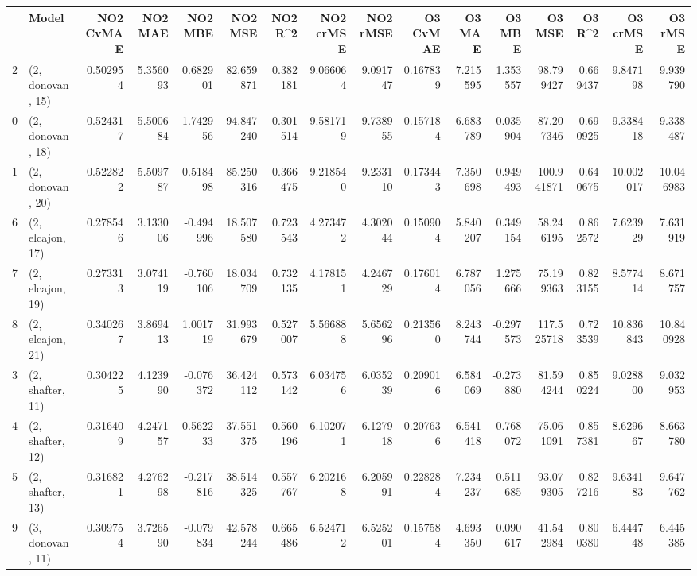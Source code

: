 \begin{tabular}{llrrrrrrrrrrrrrr}
\toprule
{} &             Model &  NO2 CvMAE &   NO2 MAE &   NO2 MBE &    NO2 MSE &   NO2 R\textasciicircum2 &  NO2 crMSE &  NO2 rMSE &  O3 CvMAE &    O3 MAE &    O3 MBE &      O3 MSE &    O3 R\textasciicircum2 &   O3 crMSE &    O3 rMSE \\
\midrule
2  &  (2, donovan, 15) &   0.502954 &  5.356093 &  0.682901 &  82.659871 &  0.382181 &   9.066064 &  9.091747 &  0.167839 &  7.215595 &  1.353557 &   98.799427 &  0.669437 &   9.847198 &   9.939790 \\
0  &  (2, donovan, 18) &   0.524317 &  5.500684 &  1.742956 &  94.847240 &  0.301514 &   9.581719 &  9.738955 &  0.157184 &  6.683789 & -0.035904 &   87.207346 &  0.690925 &   9.338418 &   9.338487 \\
1  &  (2, donovan, 20) &   0.522822 &  5.509787 &  0.518498 &  85.250316 &  0.366475 &   9.218540 &  9.233110 &  0.173443 &  7.350698 &  0.949493 &  100.941871 &  0.640675 &  10.002017 &  10.046983 \\
6  &  (2, elcajon, 17) &   0.278546 &  3.133006 & -0.494996 &  18.507580 &  0.723543 &   4.273472 &  4.302044 &  0.150904 &  5.840207 &  0.349154 &   58.246195 &  0.862572 &   7.623929 &   7.631919 \\
7  &  (2, elcajon, 19) &   0.273313 &  3.074119 & -0.760106 &  18.034709 &  0.732135 &   4.178151 &  4.246729 &  0.176014 &  6.787056 &  1.275666 &   75.199363 &  0.823155 &   8.577414 &   8.671757 \\
8  &  (2, elcajon, 21) &   0.340267 &  3.869413 &  1.001719 &  31.993679 &  0.527007 &   5.566888 &  5.656296 &  0.213560 &  8.243744 & -0.297573 &  117.525718 &  0.723539 &  10.836843 &  10.840928 \\
3  &  (2, shafter, 11) &   0.304225 &  4.123990 & -0.076372 &  36.424112 &  0.573142 &   6.034756 &  6.035239 &  0.209016 &  6.584069 & -0.273880 &   81.594244 &  0.850224 &   9.028800 &   9.032953 \\
4  &  (2, shafter, 12) &   0.316409 &  4.247157 &  0.562233 &  37.551375 &  0.560196 &   6.102071 &  6.127918 &  0.207636 &  6.541418 & -0.768072 &   75.061091 &  0.857381 &   8.629667 &   8.663780 \\
5  &  (2, shafter, 13) &   0.316821 &  4.276298 & -0.217816 &  38.514325 &  0.557767 &   6.202168 &  6.205991 &  0.228284 &  7.234237 &  0.511685 &   93.079305 &  0.827216 &   9.634183 &   9.647762 \\
9  &  (3, donovan, 11) &   0.309754 &  3.726590 & -0.079834 &  42.578244 &  0.665486 &   6.524712 &  6.525201 &  0.157584 &  4.693350 &  0.090617 &   41.542984 &  0.800380 &   6.444748 &   6.445385 \\

\end{tabular}
